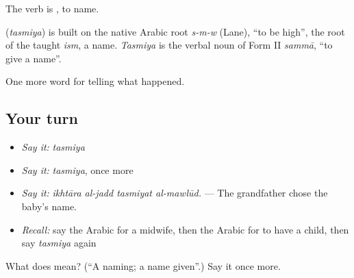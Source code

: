 The verb is , to name.

\begin{cousinweb}
\textbf{} (\emph{tasmiya}) is built on the native Arabic root \emph{s-m-w} (Lane), \textquotedblleft{}to be high\textquotedblright{}, the root of the taught \emph{ism}, a name. \emph{Tasmiya} is the verbal noun of Form II \emph{sammā}, \textquotedblleft{}to give a name\textquotedblright{}.
\end{cousinweb}

\begin{grammarlens}[title={What you've built}]
One more word for telling what happened.
\end{grammarlens}

\subsection*{Your turn}
\begin{itemize}
\raggedright
  \item \emph{Say it:} \emph{tasmiya}
  \item \emph{Say it:} \emph{tasmiya}, once more
  \item \emph{Say it:} \emph{ikhtāra al-jadd tasmiyat al-mawlūd.} — The grandfather chose the baby’s name.
  \item \emph{Recall:} say the Arabic for a midwife, then the Arabic for to have a child, then say \emph{tasmiya} again
\end{itemize}

\begin{tcolorbox}[breakable,colback=teal!4,colframe=teal!35!black,title={Before you move on}]
What does  mean? (\textquotedblleft{}A naming; a name given\textquotedblright{}.) Say it once more.
\end{tcolorbox}
